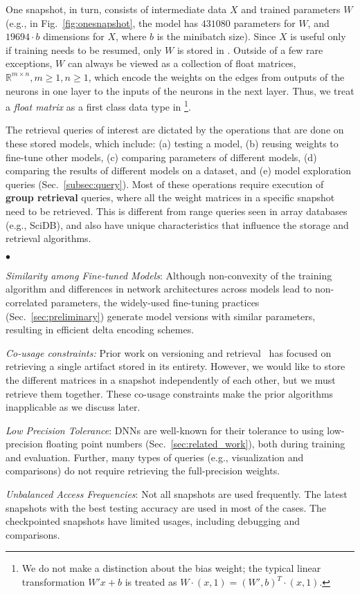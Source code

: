 \documentclass[conference]{IEEEtran}
\begin{document}
One snapshot, in turn, consists of intermediate data $X$ and trained parameters $W$ (e.g., in Fig.~\ref{fig:onesnapshot}, the model has $431080$ parameters for $W$, and $19694\cdot b$ dimensions for $X$, where $b$ is the minibatch size). Since $X$ is useful only if training needs to be resumed, only $W$ is stored in \weightstore. 
Outside of a few rare exceptions, $W$ can always be viewed as a collection of float matrices, $\mathbb{R}^{m\times n}, m \geq 1, n \geq 1$, which encode the weights on the edges from outputs of the neurons in one layer to the inputs of the neurons in the next layer. Thus, we treat a {\em float matrix} as a first class data type in \weightstore\footnote{We do not make a distinction about the bias weight; the typical linear transformation $W'x+b$ is treated as $W\cdot(x,1) = (W',b)^T\cdot(x,1)$.}.

The retrieval queries of interest are dictated by the operations that are done on these stored models, which include: 
(a) testing a model, (b) reusing weights to fine-tune other models, (c) comparing parameters of different models, (d) comparing the results of different models on a dataset, and (e) model exploration queries (Sec.~\ref{subsec:query}). Most of these operations require execution of {\bf group retrieval} queries, where all the weight matrices in a specific snapshot need to be retrieved. 
This is different from range queries seen in array databases (e.g., SciDB), and also have unique characteristics that 
influence the storage and retrieval algorithms. 

\begin{list}{$\bullet$}{\leftmargin 0.10in \topsep -2pt} %
\item \emph{Similarity among Fine-tuned Models}: Although non-convexity of the training algorithm and differences in network architectures across models lead to non-correlated parameters, the widely-used fine-tuning practices (Sec.~\ref{sec:preliminary}) generate model versions with similar parameters, resulting in efficient delta encoding schemes.
\item \emph{Co-usage constraints:} Prior work on versioning and retrieval~\cite{vldb15versioning} has focused on retrieving a single artifact stored in its entirety. However, we would like to store the different matrices in a snapshot independently of each other, but we must retrieve them together. These co-usage constraints make the prior algorithms inapplicable as we discuss later.
\item \emph{Low Precision Tolerance}: DNNs are well-known for their tolerance to using low-precision floating point numbers (Sec.~\ref{sec:related_work}), both during training and evaluation. Further, many types of queries (e.g., visualization and comparisons) do not require retrieving the full-precision weights.
\item \emph{Unbalanced Access Frequencies}: Not all snapshots are used frequently. The latest snapshots with the best testing accuracy are used in most of the cases. The checkpointed snapshots have limited usages, including debugging and comparisons. 
\end{list}
\end{document}
